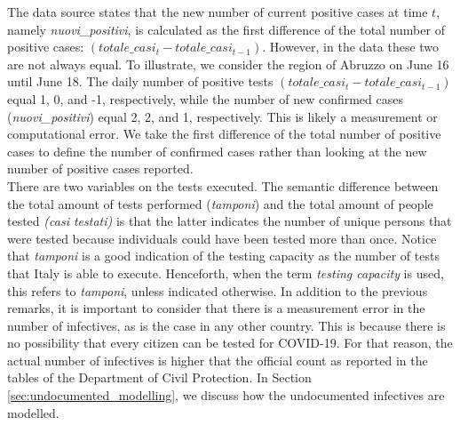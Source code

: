 \documentclass[12pt]{article}
\begin{document}
	The data source states that the new number of current positive cases at time $t$, namely \textit{nuovi\_positivi}, is calculated as the first difference of the total number of positive cases: $(totale\_casi_t - totale\_casi_{t-1})$. However, in the data these two are not always equal. To illustrate, we consider the region of Abruzzo on June 16 until June 18. The daily number of positive tests $(totale\_casi_t - totale\_casi_{t-1})$ equal 1, 0, and -1, respectively, while the number of new confirmed cases (\textit{nuovi\_positivi}) equal 2, 2, and 1, respectively. This is likely a measurement or computational error. We take the first difference of the total number of positive cases to define the number of confirmed cases rather than looking at the new number of positive cases reported. \\
	
	There are two variables on the tests executed. The semantic difference between the total amount of tests performed (\textit{tamponi}) and the total amount of people tested \textit{(casi testati)} is that the latter indicates the number of unique persons that were tested because individuals could have been tested more than once. Notice that \textit{tamponi} is a good indication of the testing capacity as the number of tests that Italy is able to execute. Henceforth, when the term \textit{testing capacity} is used, this refers to \textit{tamponi}, unless indicated otherwise. In addition to the previous remarks, it is important to consider that there is a measurement error in the number of infectives, as is the case in any other country. This is because there is no possibility that every citizen can be tested for COVID-19. For that reason, the actual number of infectives is higher that the official count as reported in the tables of the Department of Civil Protection. In Section \ref{sec:undocumented_modelling}, we discuss how the undocumented infectives are modelled. \\
	
\end{document}
